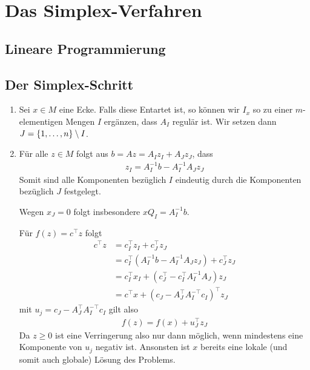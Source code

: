 \documentclass{report}
\begin{document}
	\section{Das Simplex-Verfahren}
	\subsection{Lineare Programmierung}
	\subsection{Der Simplex-Schritt}
	\begin{enumerate}
		\item Sei $x \in M$ eine Ecke. Falls diese Entartet ist, so können wir $I_x$ so zu einer $m$-elementigen Mengen $I$ ergänzen, dass $A_I$ regulär ist. Wir setzen dann $J = \qty{1, \hdots, n} \setminus I$.
		\item Für alle $z \in M$ folgt aus $b = Az = A_Iz_I + A_Jz_J$, dass
		\begin{align*}
			z_I = A_I^{-1}b - A_I^{-1}A_Jz_J
		\end{align*}
		Somit sind alle Komponenten bezüglich $I$ eindeutig durch die Komponenten bezüglich $J$ festgelegt.
		
		Wegen $x_J = 0$ folgt insbesondere $xQ_I = A_I^{-1}b$.
		
		Für $f(z) = c^\top z$ folgt
		\begin{align*}
			c^\top z
			&= c_I^\top z_I + c_J^\top z_J\\
			&= c_I^\top(A_I^{-1}b - A_I^{-1}A_Jz_J) + c_J^\top z_J\\
			&= c_I^\top x_I + (c_J^\top - c_I^\top A_I^{-1}A_J)z_J\\
			&= c^\top x + (c_J - A_J^\top A_I^{-\top} c_I)^\top z_J
		\end{align*}
		mit $u_j = c_J - A_J^\top A_I^{-\top}c_I$ gilt also
		\begin{align*}
			f(z) = f(x) + u_J^\top z_J
		\end{align*}
		Da $z \geq 0$ ist eine Verringerung also nur dann möglich, wenn mindestens eine Komponente von $u_j$ negativ ist. Ansonsten ist $x$ bereits eine lokale (und somit auch globale) Lösung des Problems.
	\end{enumerate}
\end{document}
